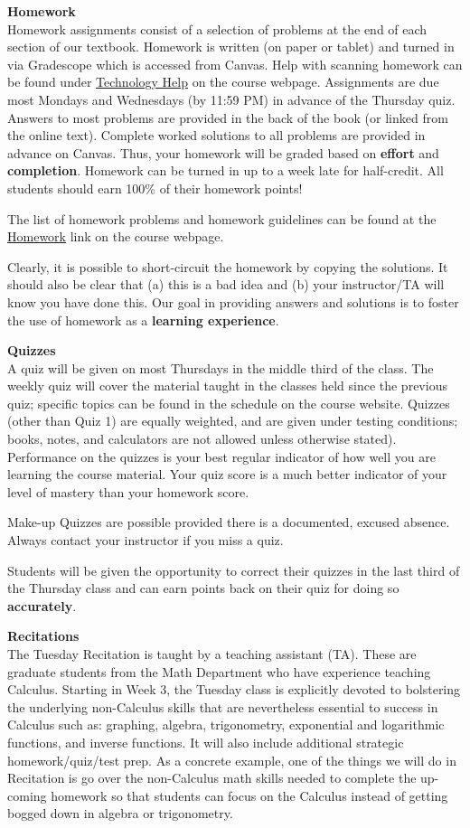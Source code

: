 \documentclass[12pt]{article}
\renewcommand{\emph}[1]{\textsf{\textbf{#1}}}
\newcommand{\localhead}[1]{\par\smallskip\textbf{#1}\nobreak\\}%
\def\heading#1{\localhead{\large\emph{#1}}}
\begin{document}
\heading{Homework}
Homework assignments consist of a selection of problems at the end of each section of our textbook. Homework is written (on paper or tablet) and turned in via Gradescope which is accessed from Canvas.  Help with scanning homework can be found under \href{https://uaf-math251.github.io/techHelp.html}{Technology Help} on the course webpage. Assignments are due most Mondays and Wednesdays (by 11:59 PM) in advance of the Thursday quiz.  Answers to most problems are provided in the back of the book (or linked from the online text). Complete worked solutions to all problems are provided in advance on Canvas. Thus, your homework will be graded based on \emph{effort} and \emph{completion}. Homework can be turned in up to a week late for half-credit. All students should earn 100\% of their homework points!

The list of homework problems and homework guidelines can be found at the \href{https://uaf-math251.github.io/writtenhomework.html}{Homework} link on the course webpage.

Clearly, it is possible to short-circuit the homework by copying the solutions. It should also be clear that (a) this is a bad idea and (b) your instructor/TA will know you have done this. Our goal in providing answers and solutions is to foster the use of homework as a \emph{learning experience}. 

\heading{Quizzes}
A quiz will be given on most Thursdays in the middle third of the class. The weekly quiz will cover the material taught in the classes held since the previous quiz; specific topics can be found in the schedule on
the course website.  Quizzes (other than Quiz 1) are equally weighted, and are given under testing conditions; books, notes, and calculators are not allowed unless otherwise stated). Performance on the quizzes is your best regular indicator of how well you are learning the course material. Your quiz score is a much better indicator of your level of mastery than your homework score.

Make-up Quizzes are possible provided there is a documented, excused absence. Always contact your instructor if you miss a quiz.

Students will be given the opportunity to correct their quizzes in the last third of the Thursday class and can earn points back on their quiz for doing so \emph{accurately}.

\heading{Recitations}
The Tuesday Recitation is taught by a teaching assistant (TA). These are graduate students from the Math  Department who have experience teaching Calculus. Starting in Week 3, the Tuesday class is explicitly devoted to bolstering the underlying non-Calculus skills that are nevertheless essential to success in Calculus such as: graphing, algebra, trigonometry, exponential and logarithmic functions, and inverse functions. It will also include additional strategic homework/quiz/test prep. As a concrete example, one of the things we will do in Recitation is go over the non-Calculus math skills needed to complete the up-coming homework so that students can focus on the Calculus instead of getting bogged down in algebra or trigonometry.
\end{document}
